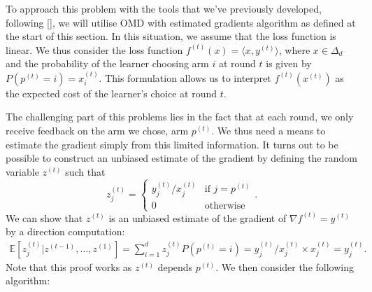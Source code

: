 To approach this problem with the tools that we've previously developed, following [\cite{shalev2025online}], we will utilise OMD with estimated gradients algorithm as defined at the start of this section. In this situation, we assume that the loss function is linear. We thus consider the loss function $f^{(t)}(x) = \langle x, y^{(t)} \rangle$, where $x \in \Delta_d$ and the probability of the learner choosing arm $i$ at round $t$ is given by $P(p^{(t)} = i) = x^{(t)}_i$. This formulation allows us to interpret $f^{(t)}(x^{(t)})$ as the expected cost of the learner's choice at round $t$.

The challenging part of this problems lies in the fact that at each round, we only receive feedback on the arm we chose, arm $p^{(t)}$. We thus need a means to estimate the gradient simply from this limited information. It turns out to be possible to construct an unbiased estimate of the gradient by defining the random variable $z^{(t)}$ such that
$$
z^{(t)}_j =
\begin{cases}
y^{(t)}_j / x^{(t)}_j & \text{if } j = p^{(t)} \\
0 & \text{otherwise}
\end{cases}
.
$$
We can show that $z^{(t)}$ is an unbiased estimate of the gradient of $\nabla f^{(t)} = y^{(t)}$ by a direction computation:
\begin{align*}
    \mathbb{E}\left[ z^{(t)}_j | z^{(t-1)}, \dots, z^{(1)} \right] = \sum_{i=1}^d z^{(t)}_j P(p^{(t)} = i) = y^{(t)}_j / x^{(t)}_j \times x^{(t)}_j = y^{(t)}_j.
\end{align*}
Note that this proof works as $z^{(t)}$ depends $p^{(t)}$.
We then consider the following algorithm:
\begin{center}
\end{center}
